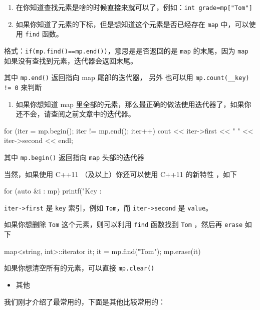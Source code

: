 \begin{enumerate}
\item 在你知道查找元素是啥的时候直接来就可以了，例如：\texttt{int grade=mp["Tom"]}
\item 如果你知道了元素的下标，但是想知道这个元素是否已经存在 \texttt{map} 中，可以使用 \texttt{find} 函数。
\end{enumerate}

格式：\texttt{if(mp.find()==mp.end())}，意思是是否返回的是 \texttt{map} 的末尾，因为 \texttt{map} 如果没有查找到元素，迭代器会返回末尾。

其中 \texttt{mp.end()} 返回指向 map 尾部的迭代器， 另外 也可以用 \texttt{mp.count(\_\_key) != 0} 来判断

\begin{enumerate}
\item 如果你想知道 map 里全部的元素，那么最正确的做法使用迭代器了，如果你还不会，请查阅之前文章中的迭代器。
\end{enumerate}

\begin{cppcode}
for (iter = mp.begin(); iter != mp.end(); iter++)
  cout << iter->first << " " << iter->second << endl;
\end{cppcode}

其中 \texttt{mp.begin()} 返回指向 \texttt{map} 头部的迭代器

当然，如果使用 C++11 （及以上）你还可以使用 C++11 的新特性 ，如下

\begin{cppcode}
for (auto &i : mp) {
  printf("Key : %
}
\end{cppcode}

\texttt{iter->first} 是 \texttt{key} 索引，例如 \texttt{Tom}，而 \texttt{iter->second} 是 \texttt{value}。

如果你想删除 \texttt{Tom} 这个元素，则可以利用 \texttt{find} 函数找到 \texttt{Tom} ，然后再 \texttt{erase} 如下

\begin{cppcode}
map<string, int>::iterator it;
it = mp.find("Tom");
mp.erase(it)
\end{cppcode}

如果你想清空所有的元素，可以直接 \texttt{mp.clear()}

\begin{itemize}
\item 其他
\end{itemize}

我们刚才介绍了最常用的，下面是其他比较常用的：

